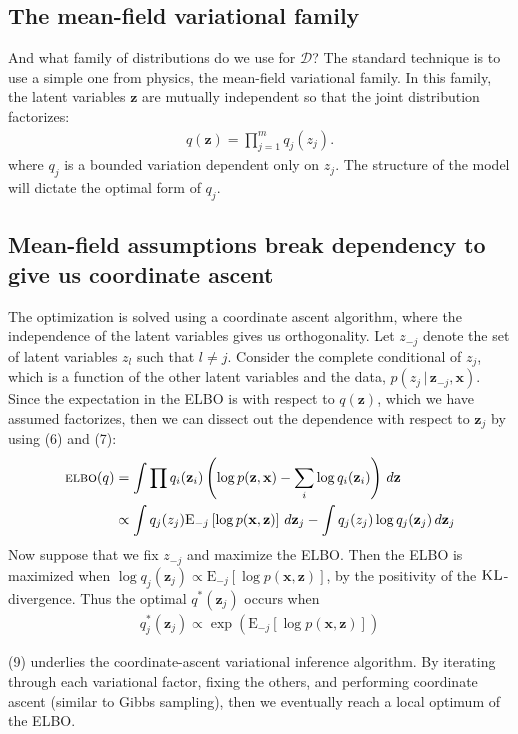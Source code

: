 \documentclass[11pt]{article}
\newcommand{\bx}{\ensuremath{\mathbf{x}}}
\newcommand{\bz}{\ensuremath{\mathbf{z}}}
\newcommand{\g}{\,\vert\,}
\newcommand{\ELBO}{\textsc{elbo}}
\newcommand{\E}{\mathrm{E}}
\begin{document}
\subsection{The mean-field variational family}
And what family of distributions do we use for $\mathcal{D}$? The standard technique is to use a simple one from physics, the mean-field variational family. In this family, the latent variables $\bz$ are mutually independent so that the joint distribution factorizes:
\begin{align}
  q(\bz) = \prod_{j=1}^{m} q_j(z_j).
\end{align}
where $q_j$ is a bounded variation dependent only on $z_j$. The structure of the model will dictate the optimal form of $q_j$. 

\subsection{Mean-field assumptions break dependency to give us coordinate ascent}
The optimization is solved using a coordinate ascent algorithm, where the independence of the latent variables gives us orthogonality. Let $z_{-j}$ denote the set of latent variables $z_l$ such that $l \neq j$. Consider the complete conditional of $z_j$, which is a function of the other latent variables and the data, $p(z_j \g \bz_{-j}, \bx)$. Since the expectation in the \textsc{ELBO} is with respect to $q(\bz)$, which we have assumed factorizes, then we can dissect out the dependence with respect to $\bz_j$ by using (6) and (7):
\begin{align}
\ELBO(q) &= \int \prod q_i(\bz_i) \left(\log p(\bz, \bx) - \sum_i \log q_i(\bz_i) \right) \,d\bz \nonumber \\
			&\propto \int q_j(z_j) \E_{-j}\left[\log p(\bx, \bz) \right] \, d\bz_j - \int q_j(z_j) \log q_j(\bz_j) \, d\bz_j
\end{align}
Now suppose that we fix $z_{-j}$ and maximize the \textsc{ELBO}. Then the \textsc{ELBO} is maximized when $\log q_j(\bz_j) \propto \E_{-j}\left[\log p(\bx, \bz) \right]$, by the positivity of the $\textsc{KL}$-divergence. Thus the optimal $q^*(\bz_j)$ occurs when
\begin{align}
q^*_j(\bz_j) \propto \exp\left(\E_{-j}\left[\log p(\bx, \bz) \right]\right)
\end{align}

(9) underlies the coordinate-ascent variational inference algorithm. By iterating through each variational factor, fixing the others, and performing coordinate ascent (similar to Gibbs sampling), then we eventually reach a local optimum of the \textsc{ELBO}.
\end{document}
